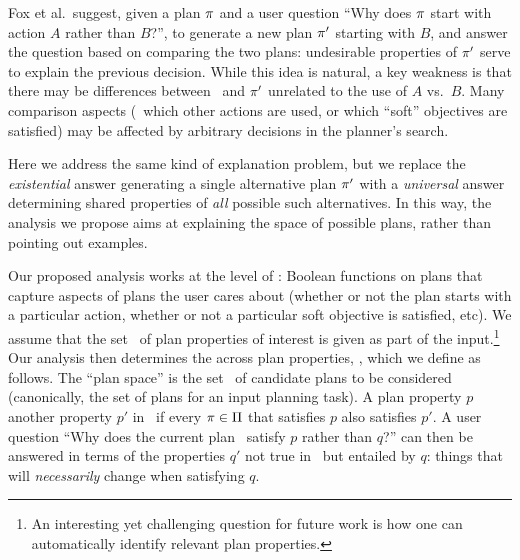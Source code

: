 Fox et al.\ suggest, given a plan $\pi$ and a user question ``Why
does $\pi$ start with action $A$ rather than $B$?'', to generate a
new plan $\pi'$ starting with $B$, and answer the question based on
comparing the two plans: undesirable properties of $\pi'$ serve to
explain the previous decision. While this idea is natural, a key
weakness is
%
%
%
that there may be differences between \plan\ and $\pi'$ unrelated to
the use of $A$ vs.\ $B$. Many comparison aspects (\eg\ which other
actions are used, or which ``soft'' objectives are satisfied) may be
affected by arbitrary decisions in the planner's search.
%

Here we address the same kind of explanation problem, but we replace
the \emph{existential} answer generating a single alternative plan
$\pi'$ with a \emph{universal} answer determining shared properties
of \emph{all} possible such alternatives. In this way, the analysis we
propose aims at explaining the space of possible plans, rather than
pointing out examples.

Our proposed analysis works at the level of :
Boolean functions on plans that capture aspects of plans the user
cares about (whether or not the plan starts with a particular action,
whether or not a particular soft objective is satisfied, etc). We
assume that the set \props\ of plan properties of interest is given as
part of the input.\footnote{An interesting yet challenging question
  for future work is how one can automatically identify relevant plan
  properties.} Our analysis then determines the 
across plan properties, \ie,  which we
define as follows. The ``plan space'' is the set \plans\ of candidate
plans to be considered (canonically, the set of plans for an input
planning task). A plan property $p$  another property
$p'$ in \plans\ if every $\pi \in \Pi$ that satisfies $p$ also
satisfies $p'$. A user question ``Why does the current plan
\plan\ satisfy $p$ rather than $q$?'' can then be answered in terms of
the properties $q'$ not true in \plan\ but entailed by $q$: things
that will \emph{necessarily} change when satisfying $q$.

